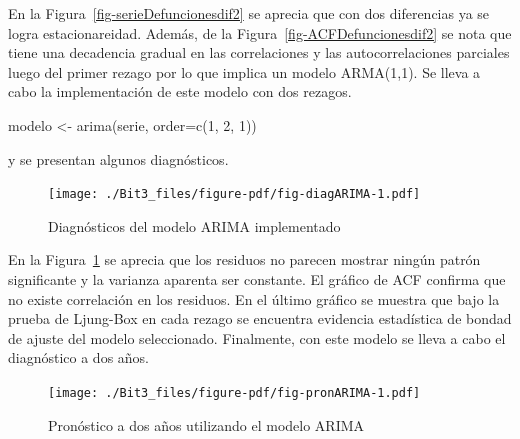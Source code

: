 \documentclass[
  letterpaper,
  onepage,
  openany]{report}
\newenvironment{Shaded}{\begin{snugshade}}{\end{snugshade}}
\newcommand{\AttributeTok}[1]{\textcolor[rgb]{0.40,0.45,0.13}{#1}}
\newcommand{\DecValTok}[1]{\textcolor[rgb]{0.68,0.00,0.00}{#1}}
\newcommand{\FunctionTok}[1]{\textcolor[rgb]{0.28,0.35,0.67}{#1}}
\newcommand{\NormalTok}[1]{\textcolor[rgb]{0.00,0.23,0.31}{#1}}
\newcommand{\OtherTok}[1]{\textcolor[rgb]{0.00,0.23,0.31}{#1}}
\begin{document}
En la Figura~\ref{fig-serieDefuncionesdif2} se aprecia que con dos
diferencias ya se logra estacionareidad. Además, de la
Figura~\ref{fig-ACFDefuncionesdif2} se nota que tiene una decadencia
gradual en las correlaciones y las autocorrelaciones parciales luego del
primer rezago por lo que implica un modelo ARMA(1,1). Se lleva a cabo la
implementación de este modelo con dos rezagos.

\begin{Shaded}
\begin{Highlighting}[]
\NormalTok{modelo }\OtherTok{\textless{}{-}} \FunctionTok{arima}\NormalTok{(serie, }\AttributeTok{order=}\FunctionTok{c}\NormalTok{(}\DecValTok{1}\NormalTok{, }\DecValTok{2}\NormalTok{, }\DecValTok{1}\NormalTok{))}
\end{Highlighting}
\end{Shaded}

y se presentan algunos diagnósticos.

\begin{figure}[H]

{\centering \texttt{[image: ./Bit3\_files/figure-pdf/fig-diagARIMA-1.pdf]}

}

\caption{\label{fig-diagARIMA}Diagnósticos del modelo ARIMA
implementado}

\end{figure}

En la Figura~\ref{fig-diagARIMA} se aprecia que los residuos no parecen
mostrar ningún patrón significante y la varianza aparenta ser constante.
El gráfico de ACF confirma que no existe correlación en los residuos. En
el último gráfico se muestra que bajo la prueba de Ljung-Box en cada
rezago se encuentra evidencia estadística de bondad de ajuste del modelo
seleccionado. Finalmente, con este modelo se lleva a cabo el diagnóstico
a dos años.

\begin{figure}[H]

{\centering \texttt{[image: ./Bit3\_files/figure-pdf/fig-pronARIMA-1.pdf]}

}

\caption{\label{fig-pronARIMA}Pronóstico a dos años utilizando el modelo
ARIMA}

\end{figure}

\hypertarget{tbl-proARIMA}{}
\begin{table}
\caption{\label{tbl-proARIMA}Pronóstico e intervalos de confianza del modelo ARIMa }\tabularnewline

\centering
{}
\end{table}
\end{document}
